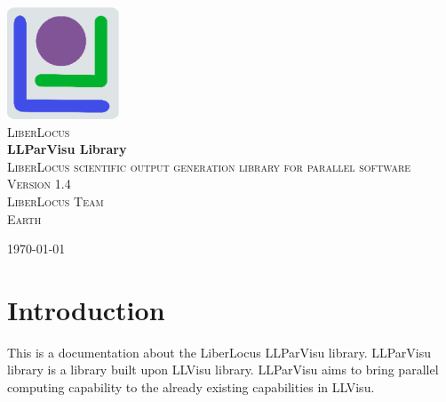 \documentclass{article}
\begin{document}
\begin{titlepage}
\begin{center}

\includegraphics[width=0.25\textwidth]{figures/LLlogo.eps}~\\[1cm]

\textsc{\LARGE LiberLocus}\\[1.5cm]

{ \huge \bfseries LLParVisu Library}\\[0.4cm]

\textsc{\Large LiberLocus scientific output generation library for parallel software}\\[0.5cm]

\textsc{Version 1.4}\\[3.5cm]

\textsc{\Large LiberLocus Team}\\[1.5cm]

\textsc{\Large Earth}\\[0.5cm]

\vfill

{\large \today}

\end{center}
\end{titlepage}


\section{Introduction}
\label{sec:intro}

This is a documentation about the LiberLocus LLParVisu library. LLParVisu library is a library built upon LLVisu library. LLParVisu aims to bring parallel computing capability to the already existing capabilities in LLVisu.
\end{document}
